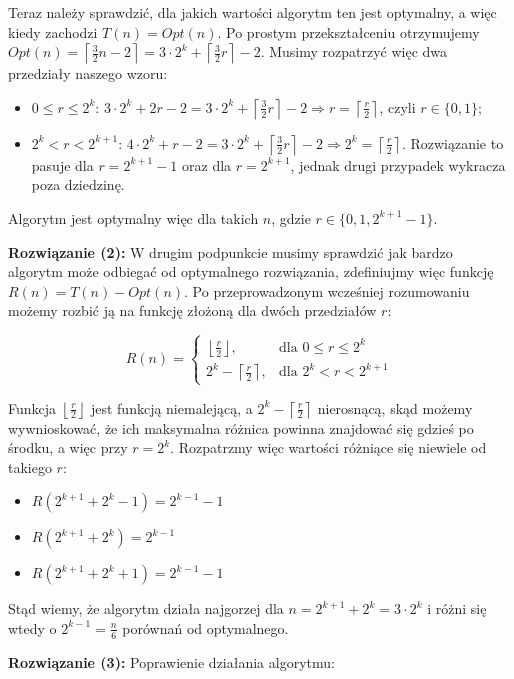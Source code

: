 \documentclass[a4paper,12pt]{article}
\newcommand{\floor}[1]{\left\lfloor #1 \right\rfloor}
\newcommand{\ceil}[1]{\left\lceil #1 \right\rceil}
\begin{document}
\noindent Teraz należy sprawdzić, dla jakich wartości algorytm ten jest optymalny, a więc kiedy zachodzi $T(n) = Opt(n)$. Po prostym przekształceniu otrzymujemy $Opt(n) = \ceil{\frac{3}{2}n-2} = 3 \cdot 2^k + \ceil{\frac{3}{2}r} - 2$. Musimy rozpatrzyć więc dwa przedziały naszego wzoru:
\begin{itemize}
\item $0 \leq r \leq 2^k$: $3\cdot 2^k + 2r - 2 = 3\cdot 2^k + \ceil{\frac{3}{2}r} - 2 \Longrightarrow r = \ceil{\frac{r}{2}}$, czyli $r \in \{ 0, 1 \}$;
\item $2^k < r < 2^{k+1}$: $4 \cdot 2^k + r - 2 = 3 \cdot 2^k + \ceil{\frac{3}{2}r} - 2 \Longrightarrow 2^k = \ceil{\frac{r}{2}}$. Rozwiązanie to pasuje dla $r=2^{k+1}-1$ oraz dla $r=2^{k+1}$, jednak drugi przypadek wykracza poza dziedzinę.
\end{itemize}
\noindent Algorytm jest optymalny więc dla takich $n$, gdzie $r \in \{ 0, 1, 2^{k+1}-1\}$. \newline

\noindent \textbf{Rozwiązanie (2):} W drugim podpunkcie musimy sprawdzić jak bardzo algorytm może odbiegać od optymalnego rozwiązania, zdefiniujmy więc funkcję $R(n)=T(n)-Opt(n)$. Po przeprowadzonym wcześniej rozumowaniu możemy rozbić ją na funkcję złożoną dla dwóch przedziałów $r$:

$$ R(n) = 
\begin{cases}
\floor{\frac{r}{2}}, 	& \text{dla } 0 \leq r \leq 2^k\\
2^k - \ceil{\frac{r}{2}}, 	& \text{dla } 2^k < r < 2^{k+1} 
\end{cases}
$$

\noindent Funkcja $\floor{\frac{r}{2}}$ jest funkcją niemalejącą, a $2^k - \ceil{\frac{r}{2}}$ nierosnącą, skąd możemy wywnioskować, że ich maksymalna różnica powinna znajdować się gdzieś po środku, a więc przy $r = 2^k$. Rozpatrzmy więc wartości różniące się niewiele od takiego $r$:
\begin{itemize}
\item $R(2^{k+1}+2^k-1) = 2^{k-1} - 1$
\item $R(2^{k+1}+2^k) = 2^{k-1}$
\item $R(2^{k+1}+2^k+1) = 2^{k-1} - 1$
\end{itemize}
\noindent Stąd wiemy, że algorytm działa najgorzej dla $n = 2^{k+1}+2^k = 3\cdot 2^k$ i różni się wtedy o $2^{k-1} = \frac{n}{6}$ porównań od optymalnego. \newline

\noindent \textbf{Rozwiązanie (3):} Poprawienie działania algorytmu:
\end{document}
